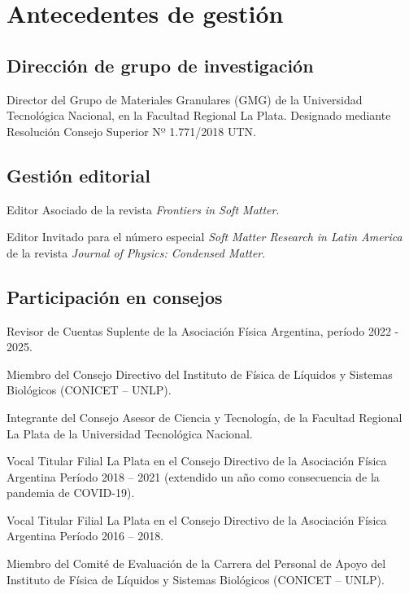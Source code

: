 \section{Antecedentes de gestión}

\subsection{Dirección de grupo de investigación}
 Director del Grupo de Materiales Granulares (GMG) de la Universidad Tecnológica Nacional, en la Facultad Regional La Plata. Designado mediante Resolución Consejo Superior Nº 1.771/2018 UTN.

\subsection{Gestión editorial}

 Editor Asociado de la revista \textit{Frontiers in Soft Matter}.

 Editor Invitado para el número especial \textit{Soft Matter Research in Latin America} de la revista \textit{Journal of Physics: Condensed Matter}.

\subsection{Participación en consejos }
 Revisor de Cuentas Suplente de la Asociación Física Argentina, período 2022 - 2025.

 Miembro del Consejo Directivo del Instituto de Física de Líquidos y Sistemas Biológicos (CONICET -- UNLP).


 Integrante del Consejo Asesor de Ciencia y Tecnología, de la Facultad Regional La Plata de la Universidad Tecnológica Nacional.

 Vocal Titular Filial La Plata en el Consejo Directivo de la Asociación Física Argentina Período 2018 -- 2021 (extendido un año como consecuencia de la pandemia de COVID-19).

 Vocal Titular Filial La Plata en el Consejo Directivo de la Asociación Física Argentina Período 2016 -- 2018.

 Miembro del Comité de Evaluación de la Carrera del Personal de Apoyo del Instituto de Física de Líquidos y Sistemas Biológicos (CONICET -- UNLP).


